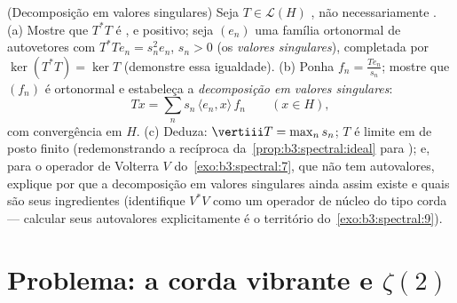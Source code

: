 \begin{exercise}[$\star\star\star$]\label{exo:b3:spectral:12}
(Decomposição em valores singulares) Seja $T \in \mathcal L(H)$ \emph{}, não
necessariamente .
(a) Mostre que $T^*T$ é ,  e positivo; seja
$(e_n)$ uma família ortonormal de autovetores com $T^*Te_n = s_n^2e_n$, $s_n > 0$ (os
\emph{valores singulares}), completada por $\ker(T^*T) = \ker T$ (demonstre essa
igualdade).
(b) Ponha $f_n = \frac{Te_n}{s_n}$; mostre que $(f_n)$ é ortonormal e estabeleça a
\emph{decomposição em valores singulares}:
\[
Tx = \sum_n s_n\,\langle e_n, x\rangle\,f_n
\qquad (x \in H),
\]
com convergência em $H$.
(c) Deduza: $\vertiii T = \max_ns_n$; $T$ é limite em  de posto
finito (redemonstrando a recíproca da~\cref{prop:b3:spectral:ideal} para ); e, para o operador de Volterra $V$ do~\cref{exo:b3:spectral:7}, que
não tem autovalores, explique por que a decomposição em valores
singulares ainda assim existe e quais são seus ingredientes
(identifique $V^*V$ como um operador de núcleo do tipo corda ---
calcular seus autovalores explicitamente é o território
do~\cref{exo:b3:spectral:9}).
\end{exercise}

\section{Problema: a corda vibrante e
\texorpdfstring{$\zeta(2)$}{zeta(2)}}

